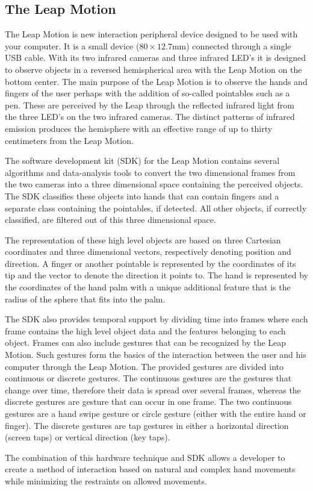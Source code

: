 \subsection{The Leap Motion}

The Leap Motion is new interaction peripheral device designed to be
used with your computer. It is a small device ($80\times12.7$mm)
connected through a single USB cable. With its two infrared
cameras and three infrared LED\textquoteright{}s it is designed to
observe objects in a reversed hemispherical area with the Leap Motion
on the bottom center. The main purpose of the Leap Motion is to observe
the hands and fingers of the user perhaps with the addition of so-called
pointables such as a pen. These are perceived by the Leap through
the reflected infrared light from the three LED\textquoteright{}s
on the two infrared cameras. The distinct patterns of infrared emission
produces the hemisphere with an effective range of up to thirty centimeters
from the Leap Motion.

The software development kit (SDK) for the Leap Motion contains several
algorithms and data-analysis tools to convert the two dimensional
frames from the two cameras into a three dimensional space containing
the perceived objects. The SDK classifies these objects into hands
that can contain fingers and a separate class containing the pointables,
if detected. All other objects, if correctly classified, are filtered
out of this three dimensional space.

The representation of these high level objects are based on three
Cartesian coordinates and three dimensional vectors, respectively
denoting position and direction. A finger or another pointable is
represented by the coordinates of its tip and the vector to denote
the direction it points to. The hand is represented by the coordinates
of the hand palm with a unique additional feature that is the radius
of the sphere that fits into the palm.

The SDK also provides temporal support by dividing time into frames
where each frame contains the high level object data and the features
belonging to each object. Frames can also include gestures that can
be recognized by the Leap Motion. Such gestures form the basics of
the interaction between the user and his computer through the Leap
Motion. The provided gestures are divided into continuous or discrete
gestures. The continuous gestures are the gestures that change over
time, therefore their data is spread over several frames, whereas
the discrete gestures are gesture that can occur in one frame. The
two continuous gestures are a hand swipe gesture or circle gesture
(either with the entire hand or finger). The discrete gestures are
tap gestures in either a horizontal direction (screen taps) or vertical
direction (key taps).

The combination of this hardware technique and SDK allows a developer
to create a method of interaction based on natural and complex hand
movements while minimizing the restraints on allowed movements. 
